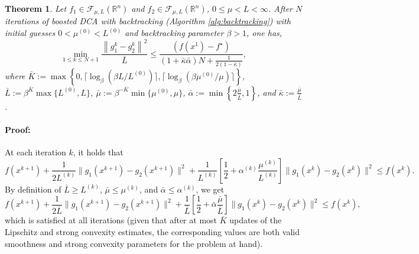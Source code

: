 \documentclass{article} %
\newtheorem{theorem}{Theorem}
\renewcommand{\leq}{\leqslant}
\renewcommand{\geq}{\geqslant}
\begin{document}
{\begin{theorem}
\label{thm:backtracking}
Let $f_1\in\mathcal{F}_{\mu, L}({\mathbb{R}^n})$ and $f_2\in\mathcal{F}_{\mu, L}({\mathbb{R}^n})$, $0 \le \mu < L < \infty$. After $N$ iterations of boosted DCA with backtracking (Algorithm \ref{alg:backtracking}) with initial guesses $0<\mu^{(0)}<L^{(0)}$ and backtracking parameter $\beta>1$, one has,
 \[
    \min_{1\leq k\leq N+1}\frac{\left\|g_1^k-g_2^k\right\|^2}{\bar{L}}\leq \frac{(f(x^1)-f^\star) }{(1+\bar{\kappa}\bar{\alpha})N + \frac{1}{2(1-\bar{\kappa})}},
\]
where  $\bar{K}:= \max\left\{0,\lceil \log_{\beta}\left(\beta L/L^{(0)}\right)\rceil, \lceil \log_{\beta}\left(\beta\mu^{(0)}/\mu\right)\rceil\right\}$, $\bar{L}:=\beta^{\bar{K}}\max\{L^{(0)}, L\}$, $\bar{\mu}:= \beta^{-\bar{K}}\min\{\mu^{(0)},\mu\}$, $\bar{\alpha}:=\min\left\{2\frac{\bar{\mu}}{\bar{L}},1\right\}$, and $\bar{\kappa}:=\frac{\bar{\mu}}{\bar{L}}$.
\end{theorem}




\paragraph{Proof:} At each iteration $k$, it holds that
\begin{equation}\label{eq:one_iteration_bt}
           f(x^{k+1})+\frac{1}{2L^{(k)}}\|g_1(x^{k+1})-g_2(x^{k+1})\|^2+
         \frac1{L^{(k)}} \left[\frac12 +\alpha^{(k)} \frac{\mu^{(k)}}{L^{(k)}}\right]\|g_1(x^k)-g_2(x^k)\|^2
         \leq  f(x^k).
  \end{equation}
By definition of $\bar{L}\geq L^{(k)}$, $\bar{\mu}\leq \mu^{(k)}$, and $\bar{\alpha}\leq \alpha^{(k)}$, we get
\begin{equation}\label{eq:one_iteration_bt}
           f(x^{k+1})+\frac{1}{2\bar{L}}\|g_1(x^{k+1})-g_2(x^{k+1})\|^2+
         \frac1{\bar{L}} \left[\frac12 +\bar{\alpha} \frac{\bar{\mu}}{\bar{L}}\right]\|g_1(x^k)-g_2(x^k)\|^2
         \leq  f(x^k),
  \end{equation}
 which is satisfied at all iterations (given that after at most $\bar{K}$ updates of the Lipschitz and strong convexity estimates, the corresponding values are both valid smoothness and strong convexity parameters for the problem at hand).
 
}
\end{document}
